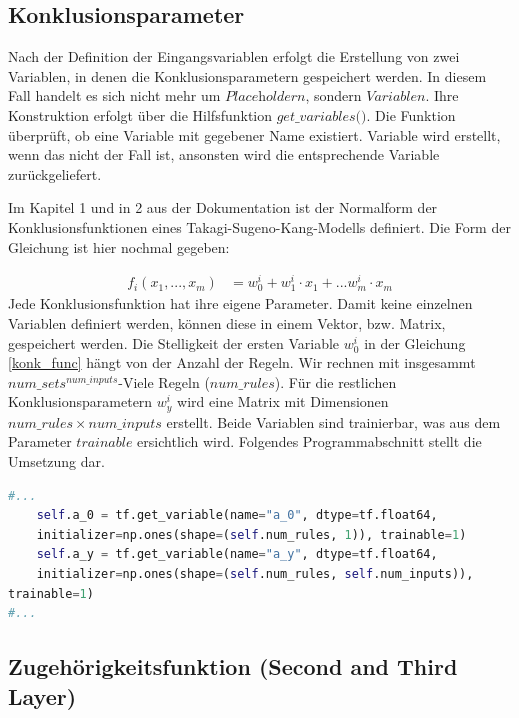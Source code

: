 \subsection{Konklusionsparameter}\label{konklusionsparameter}

Nach der Definition der Eingangsvariablen erfolgt die Erstellung von zwei Variablen, in denen die Konklusionsparametern gespeichert werden. In diesem Fall handelt es sich nicht mehr um $\textit{Placeholdern}$, sondern $\textit{Variablen}$. Ihre Konstruktion erfolgt über die Hilfsfunktion $\textit{get\_variables()}$. Die Funktion überprüft, ob eine Variable mit gegebener Name existiert. Variable wird erstellt, wenn das nicht der Fall ist, ansonsten wird die entsprechende Variable zurückgeliefert.

Im Kapitel 1 und in 2 aus der Dokumentation ist der Normalform der Konklusionsfunktionen eines Takagi-Sugeno-Kang-Modells definiert. Die Form der Gleichung ist hier nochmal gegeben:

\begin{align}
f_i(x_1, ..., x_m) & = w_0^i + w_1^i\cdot x_1 + ... w_m^i\cdot x_m
\label{konk_func}
\end{align}
Jede Konklusionsfunktion hat ihre eigene Parameter. Damit keine einzelnen Variablen definiert werden, können diese in einem Vektor, bzw. Matrix, gespeichert werden. Die Stelligkeit der ersten Variable $w_0^i$ in der Gleichung \ref{konk_func} hängt von der Anzahl der Regeln. Wir rechnen mit insgesammt $num\_sets^{num\_inputs}$-Viele Regeln ($\textit{num\_rules}$). Für die restlichen Konklusionsparametern $w_y^i$ wird eine Matrix mit Dimensionen $num\_rules\times num\_inputs$ erstellt. Beide Variablen sind trainierbar, was aus dem Parameter $\textit{trainable}$ ersichtlich wird. Folgendes Programmabschnitt stellt die Umsetzung dar.

\begin{lstlisting}[language=Python]
#...
	self.a_0 = tf.get_variable(name="a_0", dtype=tf.float64,
	initializer=np.ones(shape=(self.num_rules, 1)), trainable=1)
	self.a_y = tf.get_variable(name="a_y", dtype=tf.float64, 
	initializer=np.ones(shape=(self.num_rules, self.num_inputs)), 
trainable=1)
#...
\end{lstlisting}

\subsection{Zugehörigkeitsfunktion (Second and Third Layer)}\label{zugehuxf6rigkeitsfunktion-second-and-third-layer}

